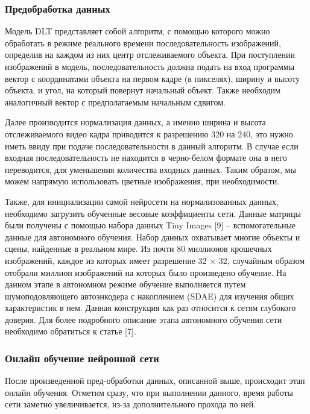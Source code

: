 \subsubsection{Предобработка данных}

Модель DLT представляет собой алгоритм, с помощью которого можно обработать в режиме реального времени последовательность изображений, определив на каждом из них центр отслеживаемого объекта. При поступлении изображений в модель, последовательность должна подать на вход программы вектор с координатами объекта на первом кадре (в пикселях), ширину и высоту объекта, и угол, на который повернут начальный объект. Также необходим аналогичный вектор с предполагаемым начальным сдвигом.

Далее производится нормализация данных, а именно ширина и высота отслеживаемого видео кадра приводится к разрешению 320 на 240, это нужно иметь ввиду при подаче последовательности в данный алгоритм. В случае если входная последовательность не находится в черно-белом формате она в него переводится, для уменьшения количества входных данных. Таким образом, мы можем напрямую использовать цветные изображения, при необходимости.

Также, для инициализации самой нейросети на нормализованных данных, необходимо загрузить обученные весовые коэффициенты сети. Данные матрицы были получены с помощью набора данных Tiny Images [9] -- вспомогательные данные для автономного обучения. Набор данных охватывает многие объекты и сцены, найденные в реальном мире. Из почти 80 миллионов крошечных изображений, каждое из которых имеет разрешение 32 × 32, случайным образом отобрали миллион изображений на которых было произведено обучение. На данном этапе в автономном режиме обучение выполняется путем шумоподовляющего автоэнкодера с накоплением (SDAE) для изучения общих характеристик в нем. Данная конструкция как раз относится к сетям глубокого доверия. Для более подробного описание этапа автономного обучения сети необходимо обратиться к статье [7].

\subsubsection{Онлайн обучение нейронной сети}

После произведенной пред-обработки данных, описанной выше, происходит этап онлайн обучения. Отметим сразу, что при выполнении данного, время работы сети заметно увеличивается, из-за дополнительного прохода по ней.

